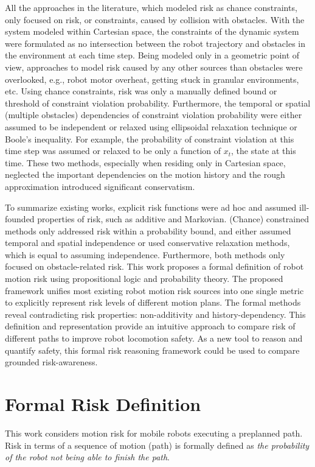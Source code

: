 \documentclass[letterpaper]{article} %
\begin{document}
All the approaches in the literature, which modeled risk as chance constraints, only focused on risk, or constraints, caused by collision with obstacles. With the system modeled within Cartesian space, the constraints of the dynamic system were formulated as no intersection between the robot trajectory and obstacles in the environment at each time step. Being modeled only in a geometric point of view, approaches to model risk caused by any other sources than obstacles were overlooked, e.g., robot motor overheat, getting stuck in granular environments, etc. Using chance constraints, risk was only a manually defined bound or threshold of constraint violation probability. Furthermore, the temporal or spatial (multiple obstacles) dependencies of constraint violation probability were either assumed to be independent or relaxed using ellipsoidal relaxation technique or Boole's inequality. For example, the probability of constraint violation at this time step was assumed or relaxed to be only a function of $x_t$, the state at this time. These two methods, especially when residing only in Cartesian space, neglected the important dependencies on the motion history and the rough approximation introduced significant conservatism. 

To summarize existing works, explicit risk functions were ad hoc and assumed ill-founded properties of risk, such as additive and Markovian. (Chance) constrained methods only addressed risk within a probability bound, and either assumed temporal and spatial independence or used conservative relaxation methods, which is equal to assuming independence. Furthermore, both methods only focused on obstacle-related risk. This work proposes a formal definition of robot motion risk using propositional logic and probability theory. The proposed framework unifies most existing robot motion risk sources into one single metric to explicitly represent risk levels of different motion plans. The formal methods reveal contradicting risk properties: non-additivity and history-dependency. This definition and representation provide an intuitive approach to compare risk of different paths to improve robot locomotion safety. As a new tool to reason and quantify safety, this formal risk reasoning framework could be used to compare grounded risk-awareness. 

\section{Formal Risk Definition}
This work considers motion risk for mobile robots executing a preplanned path. Risk in terms of a sequence of motion (path) is formally defined as \emph{the probability of the robot not being able to finish the path}. 
\end{document}
